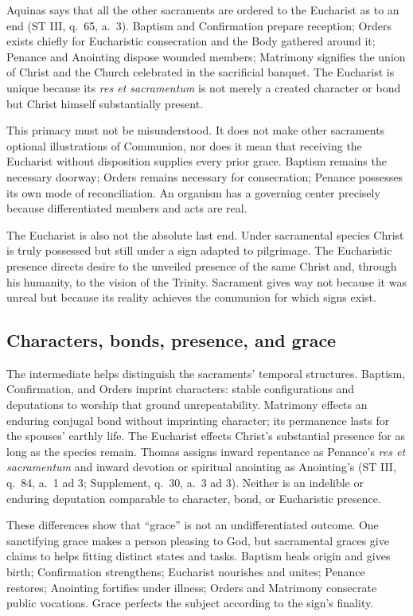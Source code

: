 Aquinas says that all the other sacraments are ordered to the Eucharist as to an end (ST III, q.~65, a.~3). Baptism and Confirmation prepare reception; Orders exists chiefly for Eucharistic consecration and the Body gathered around it; Penance and Anointing dispose wounded members; Matrimony signifies the union of Christ and the Church celebrated in the sacrificial banquet. The Eucharist is unique because its \emph{res et sacramentum} is not merely a created character or bond but Christ himself substantially present.

This primacy must not be misunderstood. It does not make other sacraments optional illustrations of Communion, nor does it mean that receiving the Eucharist without disposition supplies every prior grace. Baptism remains the necessary doorway; Orders remains necessary for consecration; Penance possesses its own mode of reconciliation. An organism has a governing center precisely because differentiated members and acts are real.

The Eucharist is also not the absolute last end. Under sacramental species Christ is truly possessed but still under a sign adapted to pilgrimage. The Eucharistic presence directs desire to the unveiled presence of the same Christ and, through his humanity, to the vision of the Trinity. Sacrament gives way not because it was unreal but because its reality achieves the communion for which signs exist.

\subsection{Characters, bonds, presence, and grace}

The intermediate  helps distinguish the sacraments' temporal structures. Baptism, Confirmation, and Orders imprint characters: stable configurations and deputations to worship that ground unrepeatability. Matrimony effects an enduring conjugal bond without imprinting character; its permanence lasts for the spouses' earthly life. The Eucharist effects Christ's substantial presence for as long as the species remain. Thomas assigns inward repentance as Penance's \emph{res et sacramentum} and inward devotion or spiritual anointing as Anointing's (ST III, q.~84, a.~1 ad 3; Supplement, q.~30, a.~3 ad 3). Neither is an indelible or enduring deputation comparable to character, bond, or Eucharistic presence.

These differences show that ``grace'' is not an undifferentiated outcome. One sanctifying grace makes a person pleasing to God, but sacramental graces give claims to helps fitting distinct states and tasks. Baptism heals origin and gives birth; Confirmation strengthens; Eucharist nourishes and unites; Penance restores; Anointing fortifies under illness; Orders and Matrimony consecrate public vocations. Grace perfects the subject according to the sign's finality.

